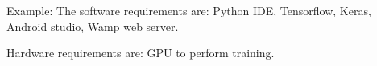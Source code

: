 \documentclass[12pt,a4paper]{report}
\begin{document}
Example: 
The software\cite{10226197} requirements are: Python IDE, Tensorflow, Keras, Android studio, Wamp web server. 

Hardware requirements are: GPU to perform training. 

\newpage
\pagestyle{plain}
\renewcommand{\bibname}{References}

\printbibliography





\end{document}
